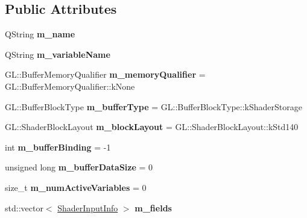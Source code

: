 \subsection*{Public Attributes}
\begin{DoxyCompactItemize}
\item 
\mbox{\label{structrev_1_1_shader_buffer_info_ac820db2640c377072be57004eebad7b5}} 
Q\+String {\bfseries m\+\_\+name}
\item 
\mbox{\label{structrev_1_1_shader_buffer_info_af31b6a98a18ca8b9646b3b7719a83bcc}} 
Q\+String {\bfseries m\+\_\+variable\+Name}
\item 
\mbox{\label{structrev_1_1_shader_buffer_info_abd3c7c5297e035ca48e83e762ef1467e}} 
G\+L\+::\+Buffer\+Memory\+Qualifier {\bfseries m\+\_\+memory\+Qualifier} = G\+L\+::\+Buffer\+Memory\+Qualifier\+::k\+None
\item 
\mbox{\label{structrev_1_1_shader_buffer_info_a27f10793c48861b33d0bfc36b837b03e}} 
G\+L\+::\+Buffer\+Block\+Type {\bfseries m\+\_\+buffer\+Type} = G\+L\+::\+Buffer\+Block\+Type\+::k\+Shader\+Storage
\item 
\mbox{\label{structrev_1_1_shader_buffer_info_a3aaaef84766f87825965ace90242a8cb}} 
G\+L\+::\+Shader\+Block\+Layout {\bfseries m\+\_\+block\+Layout} = G\+L\+::\+Shader\+Block\+Layout\+::k\+Std140
\item 
\mbox{\label{structrev_1_1_shader_buffer_info_af1af6ff2e72a8ca5d988e137e4c4b2e6}} 
int {\bfseries m\+\_\+buffer\+Binding} = -\/1
\item 
\mbox{\label{structrev_1_1_shader_buffer_info_a1e49f92482efe716a45da06564c9e422}} 
unsigned long {\bfseries m\+\_\+buffer\+Data\+Size} = 0
\item 
\mbox{\label{structrev_1_1_shader_buffer_info_ac75c04111efa90577ad911b39556267c}} 
size\+\_\+t {\bfseries m\+\_\+num\+Active\+Variables} = 0
\item 
\mbox{\label{structrev_1_1_shader_buffer_info_a6e27d32d991bab0aa1eab222d44c8c7f}} 
std\+::vector$<$ \mbox{\hyperlink{structrev_1_1_shader_input_info}{Shader\+Input\+Info}} $>$ {\bfseries m\+\_\+fields}
\end{DoxyCompactItemize}


